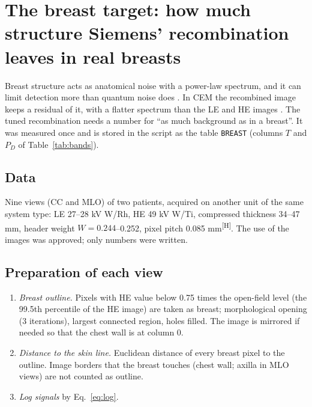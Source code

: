 \documentclass[11pt,a4paper]{article}
\newcommand{\Hd}{\textsuperscript{[H]}}
\newcommand{\code}[1]{\texttt{#1}}
\begin{document}
\section{The breast target: how much structure Siemens' recombination leaves in real breasts}\label{sec:breast}

Breast structure acts as anatomical noise with a power-law spectrum, and it can limit detection more than quantum
noise does \cite{burgess2001,heine2002,bochud1999,richard2005}. In CEM the recombined image keeps a residual of it,
with a flatter spectrum than the LE and HE images \cite{hill2013b}. The tuned recombination needs a number for ``as
much background as in a breast''. It was measured once and is
stored in the script as the table \code{BREAST} (columns $T$ and $P_D$ of Table~\ref{tab:bands}).

\subsection{Data}
Nine views (CC and MLO) of two patients, acquired on another unit of the same system type: LE 27--28 kV W/Rh, HE
49 kV W/Ti, compressed thickness 34--47 mm, header weight $W=0.244$--0.252, pixel pitch 0.085 mm\Hd. The use of the
images was approved; only numbers were written.

\subsection{Preparation of each view}
\begin{enumerate}
\item \emph{Breast outline.} Pixels with HE value below 0.75 times the open-field level (the 99.5th percentile of
the HE image) are taken as breast; morphological opening (3 iterations), largest connected region, holes filled.
The image is mirrored if needed so that the chest wall is at column 0.
\item \emph{Distance to the skin line.} Euclidean distance of every breast pixel to the outline. Image borders that
the breast touches (chest wall; axilla in MLO views) are not counted as outline.
\item \emph{Log signals} by Eq.~\eqref{eq:log}.
\end{enumerate}
\end{document}
